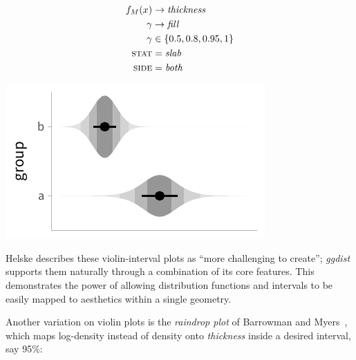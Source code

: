 \documentclass[journal]{vgtc}              %
\begin{document}
 \noindent
\begin{minipage}{.5\columnwidth}

\begin{align*}
f_M(x) &\rightarrow \textit{thickness}\\
\gamma &\rightarrow \textit{fill}\\
\gamma &\in \{0.5, 0.8, 0.95, 1\}\\
\textsc{stat} &= \mathit{slab}\\
\textsc{side} &= \mathit{both}
\end{align*}
\end{minipage}%
  \begin{minipage}{.4\columnwidth}
    \centering
    \includegraphics[width=1.2\columnwidth]{figs/3-slab_violin_interval.pdf}
  \end{minipage}
\hfill\break

Helske describes these violin-interval plots as ``more challenging to create''; \textit{ggdist} supports them naturally through a combination of its core features. This demonstrates the power of allowing distribution functions and intervals to be easily mapped to aesthetics within a single geometry.

Another variation on violin plots is the \textit{raindrop plot} of Barrowman and Myers~\cite{barrowman2003raindrop}, which maps log-density instead of density onto \textit{thickness} inside a desired interval, say 95\%:
\end{document}
